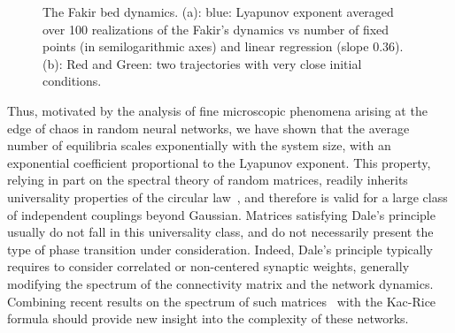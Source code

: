 \begin{figure}[htbp]
	\centering
	\caption{The Fakir bed dynamics. (a): blue: Lyapunov exponent averaged over 100 realizations of the Fakir's dynamics vs number of fixed points (in semilogarithmic axes) and linear regression (slope $0.36$). (b): Red and Green: two trajectories with very close initial conditions.}
	\label{fig:Fakir}
\end{figure}

Thus, motivated by the analysis of fine microscopic phenomena arising at the edge of chaos in random neural networks, we have shown that the average number of equilibria scales exponentially with the system size, with an exponential coefficient proportional to the Lyapunov exponent. This property, relying in part on the spectral theory of random matrices, readily inherits universality properties of the circular law~\cite{tao2008random}, and therefore is valid for a large class of independent couplings beyond Gaussian. Matrices satisfying Dale's principle usually do not fall in this universality class, and do not necessarily present the type of phase transition under consideration. Indeed, Dale's principle typically requires to consider correlated or non-centered synaptic weights, generally modifying the spectrum of the connectivity matrix and the network dynamics. Combining recent results on the spectrum of such matrices~\cite{rajan-abbott:06,tao2011outliers} with the Kac-Rice formula should provide new insight into the complexity of these networks. 

